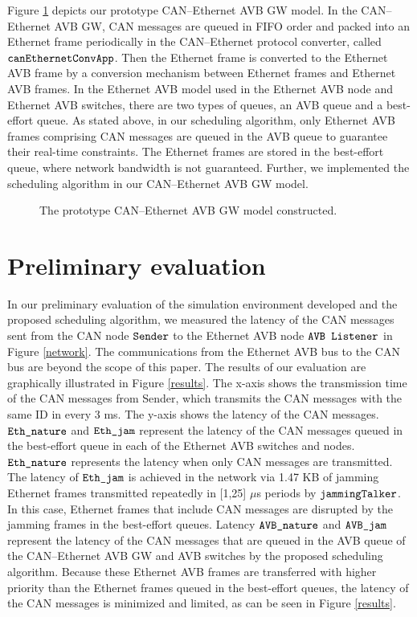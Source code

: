 \documentclass{sig-alternate}
\begin{document}
Figure \ref{gw-model} depicts our prototype CAN--Ethernet AVB GW
model. In the CAN--Ethernet AVB GW, CAN messages are queued in FIFO
order and packed into an Ethernet frame periodically in the
CAN--Ethernet protocol converter, called
$\verb|canEthernetConvApp|$. Then the Ethernet frame is converted to the
Ethernet AVB frame by a conversion mechanism between Ethernet frames and
Ethernet AVB frames. In the Ethernet AVB model used in the Ethernet AVB
node and Ethernet AVB switches, there are two types of queues, an AVB
queue and a best-effort queue. As stated above, in our scheduling
algorithm, only Ethernet AVB frames comprising CAN messages are queued
in the AVB queue to guarantee their real-time constraints. The Ethernet
frames are stored in the best-effort queue, where network bandwidth is
not guaranteed. Further, we implemented the scheduling algorithm in our
CAN--Ethernet AVB GW model.

\begin{figure}
 \centering
 \caption{The prototype CAN--Ethernet AVB GW model constructed.}
 \label{gw-model}
\end{figure}

\section{Preliminary evaluation}

In our preliminary evaluation of the simulation environment developed
and the proposed scheduling algorithm, we measured the latency of the
CAN messages sent from the CAN node $\verb|Sender|$ to the Ethernet AVB
node $\verb|AVB Listener|$ in Figure \ref{network}. The communications
from the Ethernet AVB bus to the CAN bus are beyond the scope of this
paper. The results of our evaluation are graphically illustrated in
Figure \ref{results}. The x-axis shows the transmission time of the CAN
messages from Sender, which transmits the CAN messages with the same ID
in every 3 ms. The y-axis shows the latency of the CAN
messages. $\verb|Eth_nature|$ and $\verb|Eth_jam|$ represent the latency
of the CAN messages queued in the best-effort queue in each of the
Ethernet AVB switches and nodes. $\verb|Eth_nature|$ represents the
latency when only CAN messages are transmitted. The latency of
$\verb|Eth_jam|$ is achieved in the network via 1.47 KB of jamming
Ethernet frames transmitted repeatedly in [1,25] $\mu$s periods by
$\verb|jammingTalker|$. In this case, Ethernet frames that include CAN
messages are disrupted by the jamming frames in the best-effort
queues. Latency $\verb|AVB_nature|$ and $\verb|AVB_jam|$ represent the
latency of the CAN messages that are queued in the AVB queue of the
CAN--Ethernet AVB GW and AVB switches by the proposed scheduling
algorithm. Because these Ethernet AVB frames are transferred with higher
priority than the Ethernet frames queued in the best-effort queues, the
latency of the CAN messages is minimized and limited, as can be seen in
Figure \ref{results}.
\end{document}
